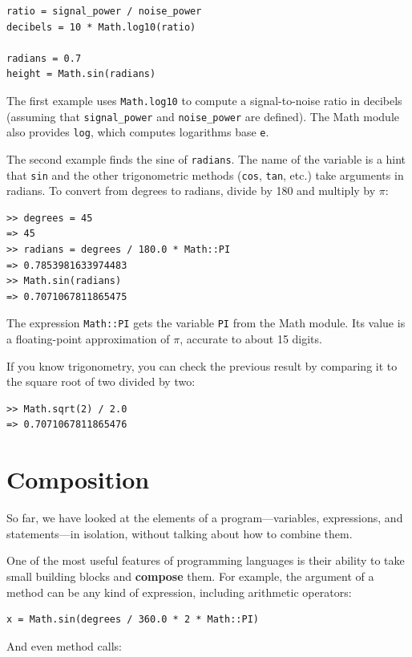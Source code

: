 \documentclass[10pt]{book}
\begin{document}
\begin{verbatim}
ratio = signal_power / noise_power
decibels = 10 * Math.log10(ratio)

radians = 0.7
height = Math.sin(radians)
\end{verbatim}
%
The first example uses \verb"Math.log10" to compute 
a signal-to-noise ratio in decibels (assuming that \verb"signal_power" and
\verb"noise_power" are defined).  The Math module also provides {\tt log},
which computes logarithms base {\tt e}.

The second example finds the sine of {\tt radians}.  The name of the
variable is a hint that {\tt sin} and the other trigonometric
methods ({\tt cos}, {\tt tan}, etc.)  take arguments in radians.  To
convert from degrees to radians, divide by 180 and multiply by
$\pi$:

\begin{verbatim}
>> degrees = 45
=> 45
>> radians = degrees / 180.0 * Math::PI
=> 0.7853981633974483
>> Math.sin(radians)
=> 0.7071067811865475
\end{verbatim}
%
The expression {\tt Math::PI} gets the variable {\tt PI} from the Math
module.  Its value is a floating-point approximation
of $\pi$, accurate to about 15 digits.

If you know
trigonometry, you can check the previous result by comparing it to
the square root of two divided by two:

\begin{verbatim}
>> Math.sqrt(2) / 2.0
=> 0.7071067811865476
\end{verbatim}
%

\section{Composition}

So far, we have looked at the elements of a program---variables,
expressions, and statements---in isolation, without talking about how to
combine them.

One of the most useful features of programming languages is their
ability to take small building blocks and {\bf compose} them.  For
example, the argument of a method can be any kind of expression,
including arithmetic operators:

\begin{verbatim}
x = Math.sin(degrees / 360.0 * 2 * Math::PI)
\end{verbatim}
%
And even method calls:
\end{document}
